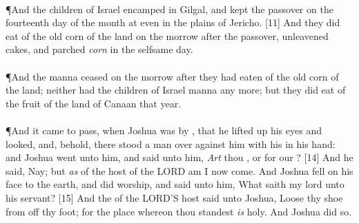 \\
\P \textcolor[cmyk]{0.99998,1,0,0}{And the children of Israel encamped in Gilgal, and kept the passover on the fourteenth day of the month at even in the plains of Jericho.}
[11] \textcolor[cmyk]{0.99998,1,0,0}{And they did eat of the old corn of the land on the morrow after the passover, unleavened cakes, and parched \emph{corn} in the selfsame day.}\\
\\
\P \textcolor[cmyk]{0.99998,1,0,0}{And the manna ceased on the morrow after they had eaten of the old corn of the land; neither had the children of Israel manna any more; but they did eat of the fruit of the land of Canaan that year.}\\
\\
\P \textcolor[cmyk]{0.99998,1,0,0}{And it came to pass, when Joshua was by , that he lifted up his eyes and looked, and, behold, there stood a man over against him with his  in his hand: and Joshua went unto him, and said unto him, \emph{Art} thou , or for our ?}
[14] \textcolor[cmyk]{0.99998,1,0,0}{And he said, Nay; but \emph{as}  of the host of the LORD am I now come. And Joshua fell on his face to the earth, and did worship, and said unto him, What saith my lord unto his servant?}
[15] \textcolor[cmyk]{0.99998,1,0,0}{And the  of the LORD'S host said unto Joshua, Loose thy shoe from off thy foot; for the place whereon thou standest \emph{is} holy. And Joshua did so.}